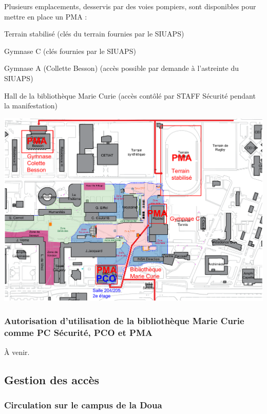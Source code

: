 \documentclass[hidelinks, paper=a4, fontsize=13pt]{report}
\begin{document}
Plusieurs emplacements, desservis par des voies pompiers, sont disponibles pour mettre en place un PMA :
\begin{list}{•}{}
	\item Terrain stabilisé (clés du terrain fournies par le SIUAPS)
	\item Gymnase C (clés fournies par le SIUAPS)
	\item Gymnase A (Collette Besson) (accès possible par demande à l’astreinte du SIUAPS)
	\item Hall de la bibliothèque Marie Curie (accès contôlé par STAFF Sécurité pendant la manifestation)
\end{list}
\begin{center}
	\includegraphics[width=.8\textwidth,keepaspectratio]{Exports/Plan_24h_45eme-PCO_PMA}
	\label{refEmplacementPMA}
\end{center}

\newpage


\subsubsection{Autorisation d’utilisation de la bibliothèque Marie Curie comme PC Sécurité, PCO et PMA}
À venir.
\begin{center}
\end{center}


\subsection{Gestion des accès}
\subsubsection{Circulation sur le campus de la Doua}
\label{refAccesCampus}
\end{document}
